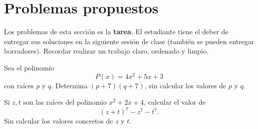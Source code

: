 \section{Problemas propuestos}

Los problemas de esta sección es la \textbf{tarea}.
El estudiante tiene el deber de entregar sus soluciones en la siguiente sesión de clase (también se pueden entregar borradores).
Recordar realizar un trabajo claro, ordenado y limpio.

\showLine
\begin{multicols}{2}
    \begin{exercise}
        Sea el polinomio
        \[
            P(x) = 4x^2 + 5x + 3
        \]
        con raíces $p$ y $q$.
        Determina $(p + 7)(q + 7)$, sin calcular los valores de $p$ y $q$.
    \end{exercise}

    \begin{problem}
        Si $z, t$ son las raíces del polinomio $x^2 + 2x + 4$, calcular el valor de
        \[
            (z + t)^7 - z^7 - t^7.
        \]
        Sin calcular los valores concretos de $z$ y $t$.
    \end{problem}

\end{multicols}